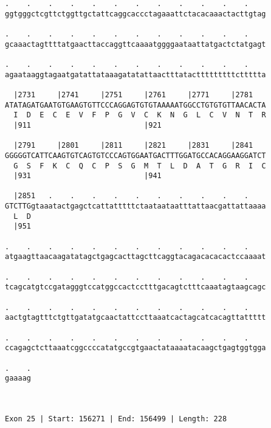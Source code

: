 \documentclass{article}
\begin{document}
\begin{Verbatim}
.    .    .    .    .    .    .    .    .    .    .    .    
ggtgggctcgttctggttgctattcaggcaccctagaaattctacacaaactacttgtag
                                                            
.    .    .    .    .    .    .    .    .    .    .    .    
gcaaactagttttatgaacttaccaggttcaaaatggggaataattatgactctatgagt
                                                            
.    .    .    .    .    .    .    .    .    .    .    .    
agaataaggtagaatgatattataaagatatattaactttatactttttttttcttttta
                                                            
  |2731     |2741     |2751     |2761     |2771     |2781   
ATATAGATGAATGTGAAGTGTTCCCAGGAGTGTGTAAAAATGGCCTGTGTGTTAACACTA
  I  D  E  C  E  V  F  P  G  V  C  K  N  G  L  C  V  N  T  R
  |911                          |921                        
  
  |2791     |2801     |2811     |2821     |2831     |2841   
GGGGGTCATTCAAGTGTCAGTGTCCCAGTGGAATGACTTTGGATGCCACAGGAAGGATCT
  G  S  F  K  C  Q  C  P  S  G  M  T  L  D  A  T  G  R  I  C
  |931                          |941                        
  
  |2851   .    .    .    .    .    .    .    .    .    .    
GTCTTGgtaaatactgagctcattatttttctaataataatttattaacgattattaaaa
  L  D                                                      
  |951                                                      
  
.    .    .    .    .    .    .    .    .    .    .    .    
atgaagttaacaagatatagctgagcacttagcttcaggtacagacacacactccaaaat
                                                            
.    .    .    .    .    .    .    .    .    .    .    .    
tcagcatgtccgatagggtccatggccactcctttgacagtctttcaaatagtaagcagc
                                                            
.    .    .    .    .    .    .    .    .    .    .    .    
aactgtagtttctgttgatatgcaactattccttaaatcactagcatcacagttattttt
                                                            
.    .    .    .    .    .    .    .    .    .    .    .    
ccagagctcttaaatcggccccatatgccgtgaactataaaatacaagctgagtggtgga
                                                            
.    .
gaaaag
      
      
 
Exon 25 | Start: 156271 | End: 156499 | Length: 228
 

\end{Verbatim}
\end{document}
